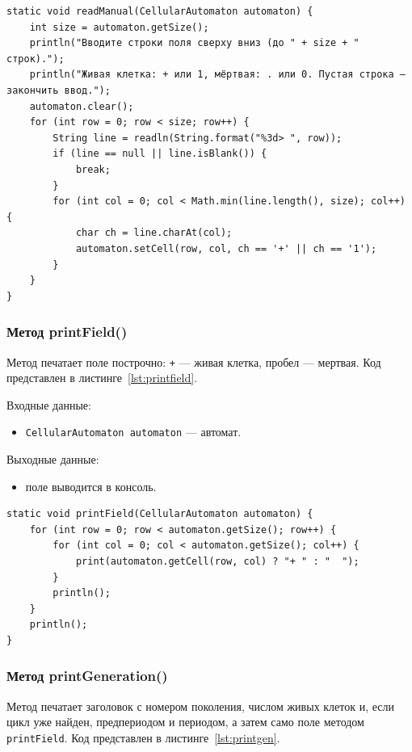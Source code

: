 \begin{lstlisting}[caption={Метод readManual()}, label={lst:manual}]
static void readManual(CellularAutomaton automaton) {
	int size = automaton.getSize();
	println("Вводите строки поля сверху вниз (до " + size + " строк).");
	println("Живая клетка: + или 1, мёртвая: . или 0. Пустая строка — закончить ввод.");
	automaton.clear();
	for (int row = 0; row < size; row++) {
		String line = readln(String.format("%3d> ", row));
		if (line == null || line.isBlank()) {
			break;
		}
		for (int col = 0; col < Math.min(line.length(), size); col++) {
			char ch = line.charAt(col);
			automaton.setCell(row, col, ch == '+' || ch == '1');
		}
	}
}
\end{lstlisting}

\subsubsection*{Метод printField()}

Метод печатает поле построчно: \texttt{+} --- живая клетка, пробел --- мертвая. Код представлен в листинге~\ref{lst:printfield}.

Входные данные:
\begin{itemize}
	\item \texttt{CellularAutomaton automaton} --- автомат.
\end{itemize}

Выходные данные:
\begin{itemize}
	\item поле выводится в консоль.
\end{itemize}

\begin{lstlisting}[caption={Метод printField()}, label={lst:printfield}]
static void printField(CellularAutomaton automaton) {
	for (int row = 0; row < automaton.getSize(); row++) {
		for (int col = 0; col < automaton.getSize(); col++) {
			print(automaton.getCell(row, col) ? "+ " : "  ");
		}
		println();
	}
	println();
}
\end{lstlisting}

\subsubsection*{Метод printGeneration()}

Метод печатает заголовок с номером поколения, числом живых клеток и, если цикл уже найден, предпериодом и периодом, а затем само поле методом \texttt{printField}. Код представлен в листинге~\ref{lst:printgen}.

